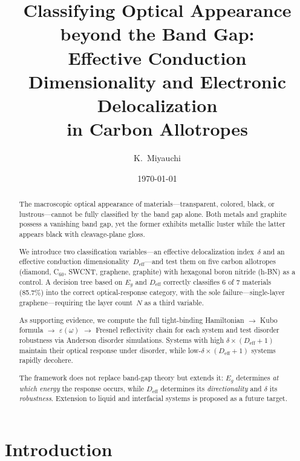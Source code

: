 \documentclass[twocolumn,showpacs,preprintnumbers,amsmath,amssymb,prb]{revtex4-2}
\begin{document}

\title{Classifying Optical Appearance beyond the Band Gap: \\
Effective Conduction Dimensionality and Electronic Delocalization \\
in Carbon Allotropes}

\author{K.~Miyauchi}

\date{\today}

\begin{abstract}
The macroscopic optical appearance of materials---transparent, colored,
black, or lustrous---cannot be fully classified by the band gap alone.
Both metals and graphite possess a vanishing band gap, yet the former
exhibits metallic luster while the latter appears black with cleavage-plane
gloss.

We introduce two classification variables---an effective delocalization
index~$\delta$ and an effective conduction dimensionality~$D_\mathrm{eff}$---and
test them on five carbon allotropes (diamond, C$_{60}$, SWCNT, graphene,
graphite) with hexagonal boron nitride (h-BN) as a control.
A decision tree based on $E_g$ and $D_\mathrm{eff}$ correctly classifies
6 of 7 materials (85.7\%) into the correct optical-response category,
with the sole failure---single-layer graphene---requiring the layer
count~$N$ as a third variable.

As supporting evidence, we compute the full
tight-binding Hamiltonian $\to$ Kubo formula $\to$
$\varepsilon(\omega)$ $\to$ Fresnel reflectivity chain for each system
and test disorder robustness via Anderson disorder simulations.
Systems with high $\delta \times (D_\mathrm{eff}+1)$ maintain their
optical response under disorder, while low-$\delta \times (D_\mathrm{eff}+1)$
systems rapidly decohere.

The framework does not replace band-gap theory but extends it: $E_g$
determines \emph{at which energy} the response occurs, while
$D_\mathrm{eff}$ determines its \emph{directionality} and $\delta$
its \emph{robustness}.
Extension to liquid and interfacial systems is proposed as a future
target.
\end{abstract}

\maketitle

\section{Introduction}
\end{document}
